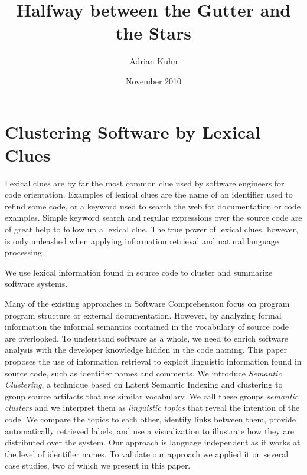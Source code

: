 \documentclass[10pt]{book}
\title{Halfway between the Gutter and the Stars}
\author{Adrian Kuhn}
\date{November 2010}
\begin{document}
\maketitle

\tableofcontents



\chapter{Clustering Software by Lexical Clues}
\label{the chapter on lexical clues}

Lexical clues are by far the most common clue used by software engineers for code orientation. Examples of lexical clues are the name of an identifier used to refind some code, or a keyword used to search the web for documentation or code examples. Simple keyword search and regular expressions over the source code are of great help to follow up a lexical clue. The true power of lexical clues, however, is only unleashed when applying information retrieval and natural language processing. 

We use lexical information found in source code to cluster and summarize software systems.


Many of the existing approaches in Software Comprehension focus on program program structure or external documentation. However, by analyzing formal information the informal semantics contained in the vocabulary of source code are overlooked. To understand software as a whole, we need to enrich software analysis with the developer knowledge hidden in the code naming. This paper proposes the use of information retrieval to exploit linguistic information found in source code, such as identifier names and comments. We introduce \emph{Semantic Clustering}, a technique based on Latent Semantic Indexing and clustering to group source artifacts that use similar vocabulary. We call these groups \emph{semantic clusters} and we interpret them as \emph{linguistic topics} that reveal the intention of the code. We compare the topics to each other, identify links between them, provide automatically retrieved labels, and use a visualization to illustrate how they are distributed over the system. Our approach is language independent as it works at the level of identifier names. To validate our approach we applied it on several case studies, two of which we present in this paper.
\end{document}
